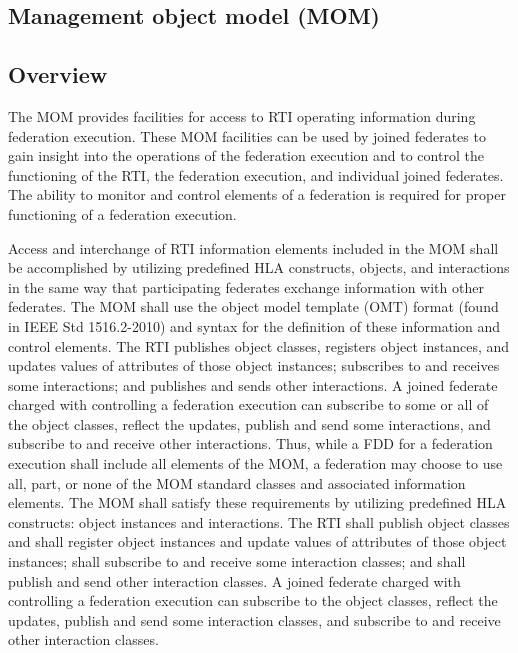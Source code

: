 
\clearpage

\begin{compactstdpage}
    \section{Management object model (MOM)}

    \subsection{Overview}

    The MOM provides facilities for access to RTI operating information during federation execution. These MOM facilities can be used by joined federates to gain insight into the operations of the federation execution and to control the functioning of the RTI, the federation execution, and individual joined federates. The ability to monitor and control elements of a federation is required for proper functioning of a federation execution.

    Access and interchange of RTI information elements included in the MOM shall be accomplished by utilizing predefined HLA constructs, objects, and interactions in the same way that participating federates exchange information with other federates. The MOM shall use the object model template (OMT) format (found in IEEE Std 1516.2-2010) and syntax for the definition of these information and control elements. The RTI publishes object classes, registers object instances, and updates values of attributes of those object instances; subscribes to and receives some interactions; and publishes and sends other interactions. A joined federate charged with controlling a federation execution can subscribe to some or all of the object classes, reflect the updates, publish and send some interactions, and subscribe to and receive other interactions. Thus, while a FDD for a federation execution shall include all elements of the MOM, a federation may choose to use all, part, or none of the MOM standard classes and associated information elements. The MOM shall satisfy these requirements by utilizing predefined HLA constructs: object instances and interactions. The RTI shall publish object classes and shall register object instances and update values of attributes of those object instances; shall subscribe to and receive some interaction classes; and shall publish and send other interaction classes. A joined federate charged with controlling a federation execution can subscribe to the object classes, reflect the updates, publish and send some interaction classes, and subscribe to and receive other interaction classes.


\end{compactstdpage}
